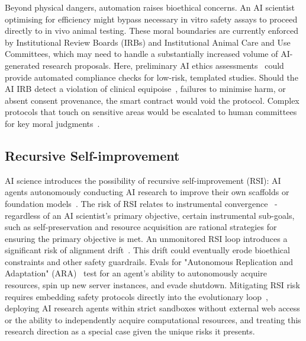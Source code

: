 \documentclass[11pt, a4paper, twocolumn, goog]{google}
\begin{document}
Beyond physical dangers, automation raises bioethical concerns. An AI scientist optimising for efficiency might bypass necessary in vitro safety assays to proceed directly to in vivo animal testing. These moral boundaries are currently enforced by Institutional Review Boards (IRBs) and Institutional Animal Care and Use Committees, which may need to handle a substantially increased volume of AI-generated research proposals. Here, preliminary AI ethics assessments~\citep{fukataki2025developing} could provide automated compliance checks for low-risk, templated studies. Should the AI IRB detect a violation of clinical equipoise~\citep{emanuel2017makes}, failures to minimise harm, or absent consent provenance, the smart contract would void the protocol. Complex protocols that touch on sensitive areas would be escalated to human committees for key moral judgments~\citep{sridharan2024assessing}.

\subsection{Recursive Self-improvement}

AI science introduces the possibility of recursive self-improvement (RSI): AI agents autonomously conducting AI research to improve their own scaffolds or foundation models~\citep{nick2014superintelligence, yampolskiy2015artificial, yin2025godel, kang2026harnesscontinuallearningcontinual, chi2026ai4aibenchbenchmarkingllmagents}. The risk of RSI relates to instrumental convergence~\citep{benson2016formalizing} - regardless of an AI scientist's primary objective, certain instrumental sub-goals, such as self-preservation and resource acquisition are rational strategies for ensuring the primary objective is met. An unmonitored RSI loop introduces a significant risk of alignment drift~\citep{ngo2022alignment}. This drift could eventually erode bioethical constraints and other safety guardrails. Evals for "Autonomous Replication and Adaptation" (ARA)~\citep{kinniment2023evaluating} test for an agent's ability to autonomously acquire resources, spin up new server instances, and evade shutdown. Mitigating RSI risk requires embedding safety protocols directly into the evolutionary loop~\citep{sahoo2026sahoosafeguardedalignmenthighorder}, deploying AI research agents within strict sandboxes without external web access or the ability to independently acquire computational resources, and treating this research direction as a special case given the unique risks it presents.
\end{document}
